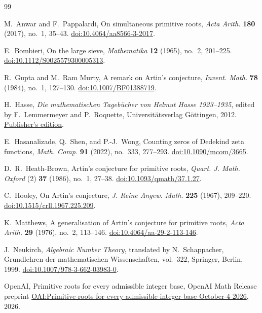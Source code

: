 \begin{thebibliography}{99}
\raggedright

M.~Anwar and F.~Pappalardi,
On simultaneous primitive roots,
\emph{Acta Arith.} \textbf{180} (2017), no.~1, 35--43.
\href{https://doi.org/10.4064/aa8566-3-2017}{doi:10.4064/aa8566-3-2017}.

E.~Bombieri,
On the large sieve,
\emph{Mathematika} \textbf{12} (1965), no.~2, 201--225.
\href{https://doi.org/10.1112/S0025579300005313}{doi:10.1112/S0025579300005313}.

R.~Gupta and M.~Ram Murty,
A remark on Artin's conjecture,
\emph{Invent. Math.} \textbf{78} (1984), no.~1, 127--130.
\href{https://doi.org/10.1007/BF01388719}{doi:10.1007/BF01388719}.

H.~Hasse,
\emph{Die mathematischen Tageb\"ucher von Helmut Hasse 1923--1935},
edited by F.~Lemmermeyer and P.~Roquette,
Universit\"atsverlag G\"ottingen, 2012.
\href{https://univerlag.uni-goettingen.de/handle/3/isbn-978-3-86395-072-9}{Publisher's edition}.

E.~Hasanalizade, Q.~Shen, and P.-J.~Wong,
Counting zeros of Dedekind zeta functions,
\emph{Math. Comp.} \textbf{91} (2022), no.~333, 277--293.
\href{https://doi.org/10.1090/mcom/3665}{doi:10.1090/mcom/3665}.

D.~R.~Heath-Brown,
Artin's conjecture for primitive roots,
\emph{Quart. J. Math. Oxford} (2) \textbf{37} (1986), no.~1, 27--38.
\href{https://doi.org/10.1093/qmath/37.1.27}{doi:10.1093/qmath/37.1.27}.

C.~Hooley,
On Artin's conjecture,
\emph{J. Reine Angew. Math.} \textbf{225} (1967), 209--220.
\href{https://doi.org/10.1515/crll.1967.225.209}{doi:10.1515/crll.1967.225.209}.

K.~Matthews,
A generalisation of Artin's conjecture for primitive roots,
\emph{Acta Arith.} \textbf{29} (1976), no.~2, 113--146.
\href{https://doi.org/10.4064/aa-29-2-113-146}{doi:10.4064/aa-29-2-113-146}.

J.~Neukirch,
\emph{Algebraic Number Theory},
translated by N.~Schappacher,
Grundlehren der mathematischen Wissenschaften, vol.~322,
Springer, Berlin, 1999.
\href{https://doi.org/10.1007/978-3-662-03983-0}{doi:10.1007/978-3-662-03983-0}.

OpenAI,
Primitive roots for every admissible integer base,
OpenAI Math Release preprint
\href{https://github.com/openai/math/blob/main/preprints/Primitive-roots-for-every-admissible-integer-base-October-4-2026/primitive-roots-all-integer-bases.pdf}{OAI:Primitive-roots-for-every-admissible-integer-base-October-4-2026},
2026.


\end{thebibliography}

